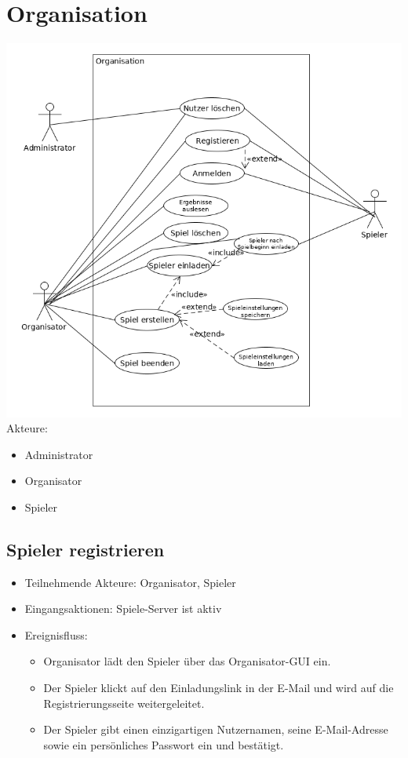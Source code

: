 \documentclass[a4paper]{scrreprt}
\begin{document}
    \section{Organisation}
    \includegraphics[width=\textwidth]{uml/export/Organisation.png}
    Akteure:
    \begin{itemize}
        \item \Gls{Administrator}
        \item \Gls{Organisator}
        \item \Gls{Spieler}
    \end{itemize}
    \newpage
   \subsection{Spieler registrieren}
    \begin{itemize}
        \item Teilnehmende Akteure: \Gls{Organisator}, \Gls{Spieler}
        \item Eingangsaktionen: Spiele-Server ist aktiv
        \item Ereignisfluss:
        \begin{itemize}
            \item Organisator lädt den Spieler über das Organisator-GUI ein.
            \item Der Spieler klickt auf den Einladungslink in der E-Mail und wird auf die Registrierungsseite weitergeleitet.
            \item Der Spieler gibt einen einzigartigen Nutzernamen, seine E-Mail-Adresse sowie ein persönliches Passwort ein und bestätigt.
        \end{itemize}
    \end{itemize}
\end{document}
